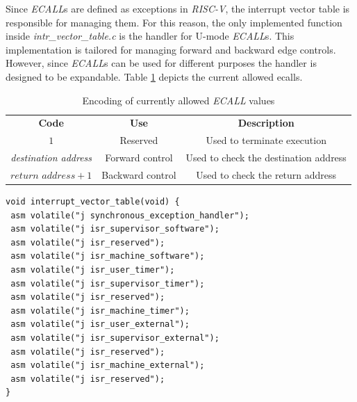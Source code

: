 Since \textit{ECALL}s are defined as exceptions in \textit{RISC-V}, the
interrupt vector table is responsible for managing them. For this reason, the
only implemented function inside \textit{intr\_vector\_table.c} is the handler for
U-mode \textit{ECALL}s. This implementation is tailored for managing forward and
backward edge controls. However, since \textit{ECALL}s can be used for different
purposes the handler is designed to be expandable. Table \ref{tab:ecalls} depicts
the current allowed ecalls.

\begin{table}
  \centering
  \begin{tabular}{|c|c|c|}
    \hline
    \textbf{Code}                & \textbf{Use}     & \textbf{Description}                  \\
    \hhline{===} $1$             & Reserved         & Used to terminate execution           \\
    \hline
    \textit{destination address} & Forward control  & Used to check the destination address \\
    \hline
    $\textit{return address}+ 1$ & Backward control & Used to check the return address      \\
    \hline
  \end{tabular}
  \caption{Encoding of currently allowed \textit{ECALL} values}
  \label{tab:ecalls}
\end{table}

\begin{lstlisting}[style=CStyle, caption = Interrput Vector Table, label={lst:intrtable}]
void interrupt_vector_table(void) {
 asm volatile("j synchronous_exception_handler");
 asm volatile("j isr_supervisor_software");
 asm volatile("j isr_reserved");
 asm volatile("j isr_machine_software");
 asm volatile("j isr_user_timer");
 asm volatile("j isr_supervisor_timer");
 asm volatile("j isr_reserved");
 asm volatile("j isr_machine_timer");
 asm volatile("j isr_user_external");
 asm volatile("j isr_supervisor_external");
 asm volatile("j isr_reserved");
 asm volatile("j isr_machine_external");
 asm volatile("j isr_reserved");
}
\end{lstlisting}

